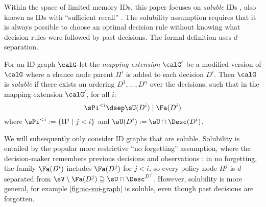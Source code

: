 Within the space of limited memory IDs, this paper focuses on \emph{soluble} IDs \citep{nilsson2000evaluating}, 
also known as IDs with ``sufficient recall'' \citep{Milch2008}.
The solubility assumption requires that 
it is always possible to choose an optimal decision rule without knowing what decision rules were followed by past decisions.
The formal definition uses $d$-separation.~










\begin{definition}
  For an ID graph $\calG$ 
  let the \emph{mapping extension} $\calG'$ be 
  a modified version of $\calG$ where a chance node parent $\Pi^i$ is added to each decision $D^i$.
  Then $\calG$ is 
  \emph{soluble} if there exists an ordering $D^1, \dots, D^n$ over the decisions, such that in the mapping extension $\calG'$, for all $i$:~ 
  \[
    \sPi^{<i} \dsep \sU(D^i) \mid \Fa(D^i)
  \]
  where $\sPi^{<i}:=\{\Pi^j\mid j < i\}$ and
  $\sU(D^i) := \sU\cap\Desc(D^i)$.
\end{definition}

We will subsequently only consider ID graphs that are soluble.
Solubility is entailed by the popular more restrictive ``no forgetting'' assumption, where
the decision-maker remembers previous decisions and observations \citep{shachter1986evaluating,Shachter2016}:
in no forgetting, 
the family $\Fa(D^i)$ includes $\Fa(D^j)$ for $j<i$, so every policy node $\Pi^j$ is $d$-separated from $\sV \setminus \Fa(D^j) \supseteq \sU \cap \Desc^{D^j}$.
However, solubility is more general, for example \cref{fig:no-voi-graph} is soluble, even though past decisions are forgotten.











